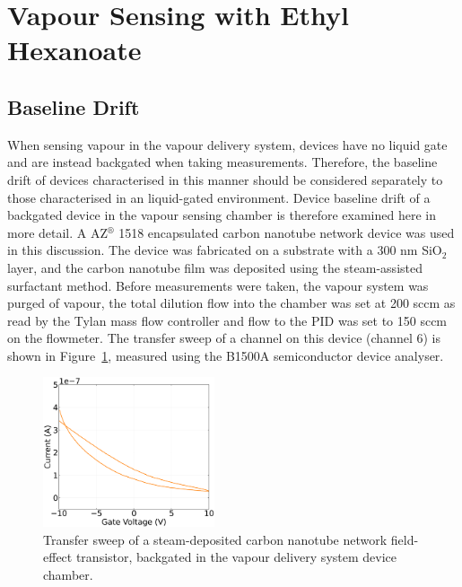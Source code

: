 \documentclass[
  a4paper,
]{scrbook}
\begin{document}
\hypertarget{sec-pristine-EtHex}{%
\section{Vapour Sensing with Ethyl Hexanoate}\label{sec-pristine-EtHex}}

\hypertarget{sec-vapour-drift}{%
\subsection{Baseline Drift}\label{sec-vapour-drift}}

When sensing vapour in the vapour delivery system, devices have no
liquid gate and are instead backgated when taking measurements.
Therefore, the baseline drift of devices characterised in this manner
should be considered separately to those characterised in an
liquid-gated environment. Device baseline drift of a backgated device in
the vapour sensing chamber is therefore examined here in more detail. A
AZ\(^\circledR\) 1518 encapsulated carbon nanotube network device was
used in this discussion. The device was fabricated on a substrate with a
300 nm SiO\(_2\) layer, and the carbon nanotube film was deposited using
the steam-assisted surfactant method. Before measurements were taken,
the vapour system was purged of vapour, the total dilution flow into the
chamber was set at 200 sccm as read by the Tylan mass flow controller
and flow to the PID was set to 150 sccm on the flowmeter. The transfer
sweep of a channel on this device (channel 6) is shown in
Figure~\ref{fig-backgate-transfer}, measured using the B1500A
semiconductor device analyser.

\begin{figure}

{\centering \includegraphics[width=0.45\textwidth,height=\textheight]{figures/ch6/Q2C6_backgate_characterisation.png}

}

\caption{\label{fig-backgate-transfer}Transfer sweep of a
steam-deposited carbon nanotube network field-effect transistor,
backgated in the vapour delivery system device chamber.}

\end{figure}
\end{document}
